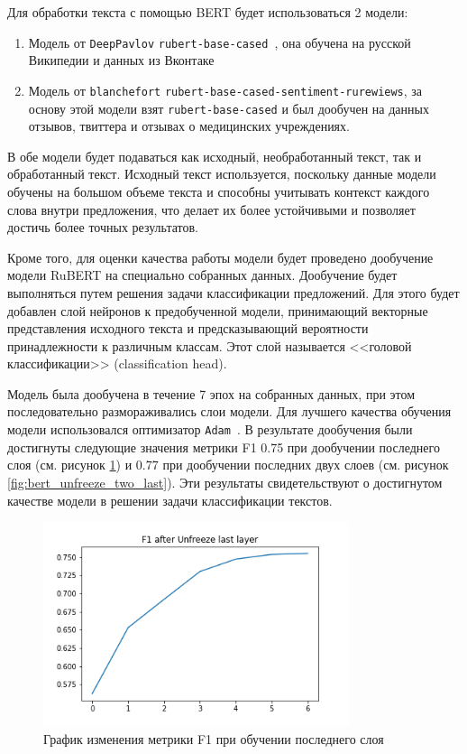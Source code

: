 \documentclass[PI, VKR]{HSEUniversity}
\begin{document}
Для обработки текста с помощью BERT будет использоваться 2 модели:
\begin{enumerate}
\item Модель от \texttt{DeepPavlov} \texttt{rubert-base-cased}~\autocite{kuratov_adaptation_2019}, она обучена на русской Википедии и данных из Вконтаке
\item Модель от \texttt{blanchefort} \texttt{rubert-base-cased-sentiment-rurewiews}, за основу этой модели взят \texttt{rubert-base-cased} и был дообучен на данных отзывов, твиттера и отзывах о медицинских учреждениях.
\end{enumerate}

В обе модели будет подаваться как исходный, необработанный текст, так и обработанный текст. Исходный текст используется, поскольку данные модели обучены на большом объеме текста и способны учитывать контекст каждого слова внутри предложения, что делает их более устойчивыми и позволяет достичь более точных результатов.

Кроме того, для оценки качества работы модели будет проведено дообучение модели RuBERT на специально собранных данных. Дообучение будет выполняться путем решения задачи классификации предложений. Для этого будет добавлен слой нейронов к предобученной модели, принимающий векторные представления исходного текста и предсказывающий вероятности принадлежности к различным классам. Этот слой называется {}<<головой классификации>>{} (classification head).

Модель была дообучена в течение 7 эпох на собранных данных, при этом последовательно размораживались слои модели. Для лучшего качества обучения модели использовался оптимизатор \texttt{Adam}~\autocite{kingma_adam_2017}. В результате дообучения были достигнуты следующие значения метрики F1 0.75 при дообучении последнего слоя (см. рисунок \ref{fig:bert_unfreeze_last}) и 0.77 при дообучении последних двух слоев (см. рисунок \ref{fig:bert_unfreeze_two_last}). Эти результаты свидетельствуют о достигнутом качестве модели в решении задачи классификации текстов.

\begin{figure}[h]
\centering
\includegraphics[width=0.8\textwidth]{img/DeepPavlovrubert-base-cased F1 Unfreeze last layer.png}
\caption{\label{fig:bert_unfreeze_last}График изменения метрики F1 при обучении последнего слоя}
\end{figure}
\end{document}
